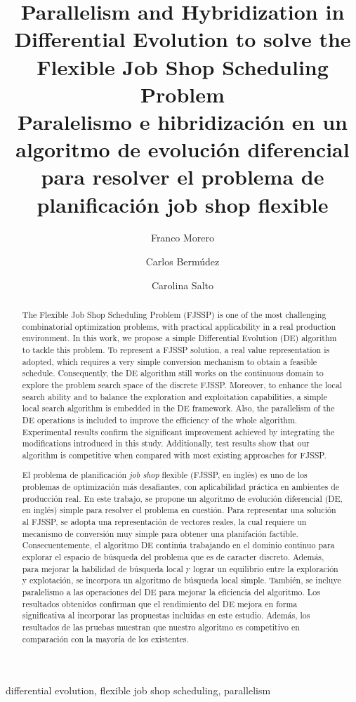 \documentclass[a4paper]{jcst}
\title{Parallelism and Hybridization in Differential Evolution to solve the Flexible Job Shop Scheduling Problem
\\
\large Paralelismo e hibridización en un algoritmo de evolución diferencial para resolver el problema de planificación job shop flexible}
\author[1\orcid{0000-0003-1488-3687}]{Franco Morero}
\author[1\orcid{0000-0001-9767-6194}]{Carlos Bermúdez}
\author[1,2\orcid{0000-0002-3417-8603}]{Carolina Salto}
\affil[1]{LISI - Facultad de Ingenier\'ia, Universidad Nacional de La Pampa, General Pico, Argentina \authorcr
\{bermudezc,saltoc\}@ing.unlpam.edu.ar}
\affil[2]{CONICET, Argentina}
\newcommand{\keywords}[1]{\par\addvspace\baselineskip
\noindent\keywordname\enspace\ignorespaces#1}
\begin{document}
\maketitle
\begin{abstract}
The Flexible Job Shop Scheduling Problem (FJSSP) is one of the most challenging combinatorial optimization problems, with practical applicability in a real production environment. In this work, we propose a simple Differential Evolution (DE) algorithm to tackle this problem. To represent a FJSSP solution, a real value representation is adopted, which requires a very simple conversion mechanism to obtain a feasible schedule. Consequently, the DE algorithm still works on the continuous domain to explore the problem search space of the discrete FJSSP. Moreover, to enhance the local search ability and to balance the exploration and exploitation capabilities, a simple local search algorithm is embedded in the DE framework. Also, the parallelism of the DE operations is included to improve the efficiency of the whole algorithm. Experimental results confirm the significant improvement achieved by integrating the modifications introduced in this study. Additionally, test results show that our algorithm is competitive when compared with most existing approaches for FJSSP.


\end{abstract}

\keywords{differential evolution, flexible job shop scheduling, parallelism}

\renewcommand{\abstractname}{Resumen}
\begin{abstract}
El problema de planificación \textit{job shop} flexible (FJSSP, en inglés) es uno de los problemas de optimización más desafiantes, con aplicabilidad práctica en ambientes de producción real. En este trabajo, se propone un algoritmo de evolución diferencial (DE, en inglés) simple para resolver el problema en cuestión. Para representar una solución al FJSSP, se adopta una representación de vectores reales, la cual requiere un mecanismo de conversión muy simple para obtener una planifación factible. Consecuentemente, el algoritmo DE continúa trabajando en el dominio continuo para explorar el espacio de búsqueda del problema que es de caracter discreto. Además, para mejorar la habilidad de búsqueda local y lograr un equilibrio entre la exploración y explotación, se incorpora un algoritmo de búsqueda local simple. También, se incluye paralelismo a las operaciones del DE para mejorar la eficiencia del algoritmo. Los resultados obtenidos confirman que el rendimiento del DE mejora en forma significativa al incorporar las propuestas incluidas en este estudio.
Además, los resultados de las pruebas muestran que nuestro algoritmo es competitivo en comparación con la mayoría de los existentes.
\end{abstract}
\end{document}
